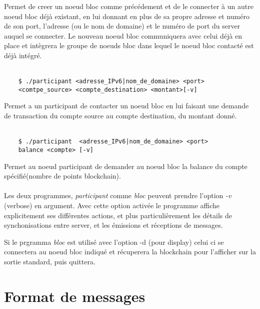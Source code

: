 \documentclass[a4paper,11pt,DIV=12]{scrreprt}
\begin{document}
    Permet de creer un noeud bloc comme précédement et de le connecter à un autre
    noeud bloc déjà existant, en lui donnant en plus de sa propre adresse et
    numéro de son port, l'adresse (ou le nom de domaine) et
    le numéro de port du server auquel se connecter. Le nouveau noeud bloc
    communiquera avec celui déjà en place et intègrera le groupe de noeuds bloc
    dans lequel le noeud bloc contacté est déjà intégré.
    \\ \\

    \begin{lstlisting}
    $ ./participant <adresse_IPv6|nom_de_domaine> <port>
    <comtpe_source> <compte_destination> <montant>[-v]
    \end{lstlisting}

    Permet a un participant de contacter un noeud bloc en lui faisant une demande
    de transaction du compte source au compte destination, du montant donné.
    \\ \\

    \begin{lstlisting}
    $ ./participant  <adresse_IPv6|nom_de_domaine> <port>
    balance <compte> [-v]
    \end{lstlisting}

    Permet au noeud participant de demander au noeud bloc la balance du compte spécifié(nombre de points blockchain).
    \\ \\

    Les deux programmes, \emph{participant} comme \emph{bloc} peuvent prendre
    l'option \emph{-v} (verbose) en argument. Avec cette option activée le
    programme affiche explicitement ses différentes actions, et plus
    particulièrement les détails de synchonisations entre server, et les
    émissions et réceptions de messages.

    Si le prgramma \emph{bloc} est utilisé avec l'option -d (pour display)
    celui ci se connectera au noeud bloc indiqué et récuperera la blockchain
    pour l'afficher sur la sortie standard, puis quittera.

    \chapter{Format de messages}
\end{document}

